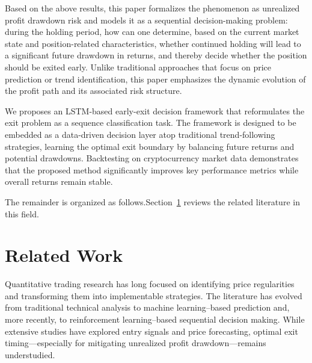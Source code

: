 \documentclass[12pt]{article}
\begin{document}
Based on the above results, this paper formalizes the phenomenon as unrealized profit 
drawdown risk and models it as a sequential decision-making problem: during the holding period, 
how can one determine, based on the current market state and position-related characteristics, 
whether continued holding will lead to a significant future drawdown in returns, and thereby 
decide whether the position should be exited early. Unlike traditional approaches that focus 
on price prediction or trend identification, this paper emphasizes the dynamic evolution of 
the profit path and its associated risk structure.

We proposes an LSTM-based early-exit decision framework that reformulates the exit problem 
as a sequence classification task. The framework is designed to be embedded as a data-driven 
decision layer atop traditional trend-following strategies, learning the optimal exit boundary 
by balancing future returns and potential drawdowns. Backtesting on cryptocurrency market 
data demonstrates that the proposed method significantly improves key performance metrics 
while overall returns remain stable.

The remainder is organized as follows.Section~\ref{sec:relatedWork} reviews the related 
literature in this field.


\section{Related Work}\label{sec:relatedWork}

Quantitative trading research has long focused on identifying price regularities and 
transforming them into implementable strategies. The literature has evolved from traditional 
technical analysis to machine learning–based prediction and, more recently, to reinforcement 
learning–based sequential decision making. While extensive studies have explored entry 
signals and price forecasting, optimal exit timing—especially for mitigating unrealized 
profit drawdown—remains understudied.
\end{document}
